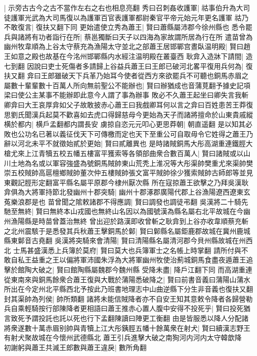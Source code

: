 |{
	示旁古古今之古不當作左右之右也相息亮翻}
秀曰召刺姦收護軍|{
	祜事伯升為大司徒護軍光武為大司馬復以為護軍百官表護軍都尉秦官平帝元始元年更名護軍}
祜乃不敢復言|{
	復扶又翻下同}
更始遣使立秀為蕭王|{
	賢曰蕭縣屬沛郡今徐州縣也}
悉令罷兵與諸將有功者詣行在所|{
	蔡邕獨斷曰天子以四海為家故謂所居為行在所}
遣苗曾為幽州牧韋順為上谷太守蔡充為漁陽太守並北之部蕭王居邯鄲宫晝臥温明殿|{
	賢曰趙王如意之殿也故基在今洺州邯鄲縣内水經注温明殿在叢臺西}
耿弇入造牀下請間|{
	造七到翻}
因說曰吏士死傷者多請歸上谷益兵蕭王曰王郎已破河北畧平復用兵何為|{
	復扶又翻}
弇曰王郎雖破天下兵革乃始耳今使者從西方來欲罷兵不可聽也銅馬赤眉之屬數十輩輩數十百萬人所向無前聖公不能辦也|{
	賢曰辦猶成也音蒲莧翻予據史記項梁曰使公主某事不能辦即此意今人謂了事為辦事}
敗必不久蕭王起坐曰卿失言我斬卿弇曰大王哀厚弇如父子故敢披赤心蕭王曰我戲卿耳何以言之弇曰百姓患苦王莽復思劉氏聞漢兵起莫不歡喜如去虎口得歸慈母今更始為天子而諸將擅命於山東貴戚縱横於都内|{
	横戶孟翻都内謂長安}
虜掠自恣元元叩心更思莽朝|{
	朝直遥翻}
是以知其必敗也公功名已著以義征伐天下可傳檄而定也天下至重公可自取毋令它姓得之蕭王乃辭以河北未平不就徵始貳於更始|{
	賢曰貳離異也}
是時諸賊銅馬大彤高湖重連鐵脛大槍尤來上江青犢五校五幡五樓富平獲索等各領部曲衆合數百萬人|{
	賢曰諸賊或以山川土地為名或以軍容強盛為號銅馬賊帥東山荒秃上淮况等大彤渠帥樊重尤來渠帥樊崇五校賊帥高扈檀鄉賊帥董次仲五樓賊帥張文富平賊帥徐少獲索賊帥古師郎等並見東觀記脛形定翻富平縣名屬平原郡今棣州厭次縣}
所在寇掠蕭王欲擊之乃拜吳漢耿弇俱為大將軍持節北發幽州十郡突騎|{
	幽州十郡涿郡廣陽代郡上谷漁陽遼西遼東玄菟樂浪郡是也}
苗曾聞之隂敕諸郡不得應調|{
	賢曰調發也調徒弔翻}
吳漢將二十騎先馳至無終|{
	賢曰無終本山戎國也無終山名因以為國號漢為縣名屬右北平故城在今幽州漁陽縣是時苗曾蓋治無終}
曾出迎於路漢即收曾斬之耿弇到上谷亦收韋順蔡充斬之北州震駭于是悉發其兵秋蕭王擊銅馬於鄡|{
	賢曰鄡縣名屬鉅鹿郡故城在冀州鹿城縣東鄡音古堯翻}
吳漢將突騎來會清陽|{
	賢曰清陽縣名屬清河郡今貝州縣故城在州西北}
士馬甚盛漢悉上兵簿於莫府|{
	賢曰莫大也兵簿軍士之名帳上時掌翻}
請所付與不敢自私王益重之王以偏將軍沛國朱浮為大將軍幽州牧使治薊城銅馬食盡夜遁蕭王追擊於館陶大破之|{
	賢曰館陶縣屬魏郡今魏州縣}
受降未盡|{
	降戶江翻下同}
而高湖重連從東南來與銅馬餘衆合蕭王復與大戰於蒲陽悉破降之|{
	賢曰前書音義曰蒲陽山蒲水所出在今定州北平縣西北予按此乃班書地理志中山曲逆縣下分生非音義也復扶又翻}
封其渠帥為列侯|{
	帥所類翻}
諸將未能信賊降者亦不自安王知其意敕令降者各歸營勒兵自乘輕騎按行部陳降者更相語曰蕭王推赤心置人腹中安得不投死乎|{
	賢曰投死猶言致死予謂投託也託以死也行下孟翻陳讀曰陣更工衡翻}
由是皆服悉以降人分配諸將衆遂數十萬赤眉别帥與青犢上江大彤銕脛五幡十餘萬衆在射犬|{
	賢曰續漢志野王有射犬聚故城在今懷州武德縣北}
蕭王引兵進擊大破之南狥河内河内太守韓歆降　初謝躬與蕭王共滅王郎數與蕭王違戾|{
	數所角翻}
